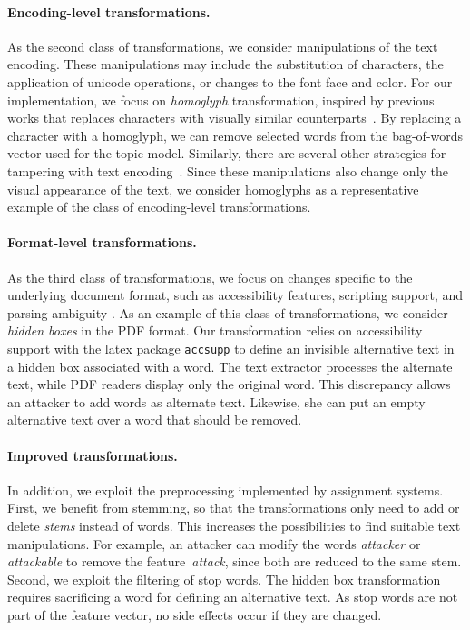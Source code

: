 \documentclass[letterpaper,twocolumn,10pt]{article}
\begin{document}
\paragraph{Encoding-level transformations.}
As the second class of transformations, we consider manipulations of the text encoding. These manipulations may include the substitution of characters, the application of unicode operations, or changes to the font face and color. For our implementation, we focus on \emph{homoglyph} transformation, inspired by previous works that replaces characters with visually similar counterparts~\cite{li-19-textbugger, eger-19-text}. By replacing a character with a homoglyph, we can remove selected words from the bag-of-words vector used for the topic model. 
Similarly, there are several other strategies for {tampering\EndAccSupp{}} with text encoding~\citep{boucher-22-bad}. Since these manipulations also change only the visual appearance of the text, we consider homoglyphs as a representative example of the class of encoding-level transformations.

\paragraph{Format-level transformations.}
As the third class of transformations, we focus on changes specific to the underlying document format, such as accessibility features, {scripting\EndAccSupp{}} support, and parsing {ambiguity\EndAccSupp{}} \citep{markwood-17-pdf}. As an example of this class of transformations, we consider \emph{hidden boxes} in the PDF format. 
Our transformation relies on accessibility support with the latex package \texttt{accsupp} to define an {invisible\EndAccSupp{}} alternative text in a hidden box associated with a word. The text extractor processes the alternate text, while PDF readers display only the original word. This discrepancy allows an attacker to add words as alternate text. Likewise, she can put an empty alternative text over a word that should be removed.

\paragraph{Improved transformations.}
In addition, we exploit the preprocessing implemented by assignment systems. 
First, we benefit from stemming, so that the transformations only need to add or delete \emph{stems} instead of words. This increases the possibilities to find suitable text manipulations. For example, an attacker can modify the words \emph{attacker} or \emph{attackable} to remove the feature~\emph{attack}, since both are reduced to the same stem.
Second, we exploit the filtering of stop words. The hidden box transformation requires {sacrificing\EndAccSupp{}} a word for defining an alternative text. As stop words are not part of the feature vector, no side effects occur if they are changed.
\end{document}
